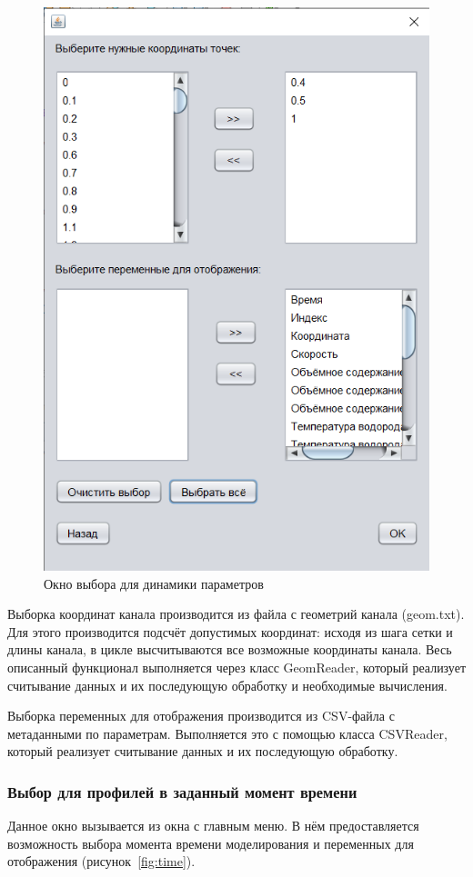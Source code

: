 \begin{figure}[H]
	\centering
	\includegraphics[width=0.5\linewidth]{pics/dynam-all}
	\caption{Окно выбора для динамики параметров}
	\label{fig:dynam-all}
\end{figure}

Выборка координат канала производится из файла с геометрий канала (geom.txt). Для этого производится подсчёт допустимых координат: исходя из шага сетки и длины канала, в цикле высчитываются все возможные координаты канала. Весь описанный функционал выполняется через класс GeomReader, который реализует считывание данных и их последующую обработку и необходимые вычисления. 

Выборка переменных для отображения производится из CSV-файла с метаданными по параметрам. Выполняется это с помощью класса CSVReader, который реализует считывание данных и их последующую обработку.

\subsubsection{Выбор для профилей в заданный момент времени}

Данное окно вызывается из окна с главным меню. В нём предоставляется возможность выбора момента времени моделирования и переменных для отображения (рисунок~\ref{fig:time}).

